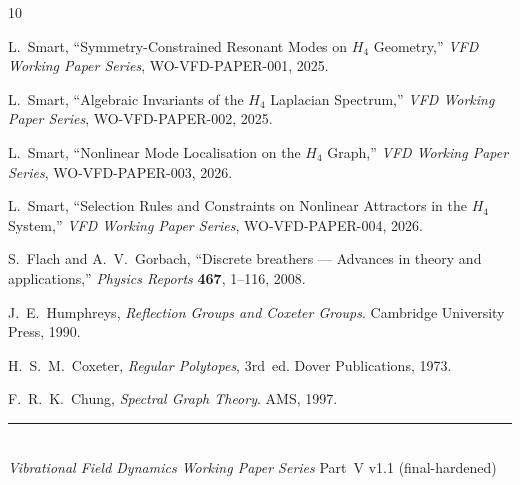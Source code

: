 \documentclass[12pt,a4paper]{article}
\begin{document}
\begin{thebibliography}{10}

L.~Smart,
``Symmetry-Constrained Resonant Modes on $H_4$ Geometry,''
\textit{VFD Working Paper Series}, WO-VFD-PAPER-001, 2025.

L.~Smart,
``Algebraic Invariants of the $H_4$ Laplacian Spectrum,''
\textit{VFD Working Paper Series}, WO-VFD-PAPER-002, 2025.

L.~Smart,
``Nonlinear Mode Localisation on the $H_4$ Graph,''
\textit{VFD Working Paper Series}, WO-VFD-PAPER-003, 2026.

L.~Smart,
``Selection Rules and Constraints on Nonlinear Attractors
in the $H_4$ System,''
\textit{VFD Working Paper Series}, WO-VFD-PAPER-004, 2026.

S.~Flach and A.~V.~Gorbach,
``Discrete breathers --- Advances in theory and applications,''
\textit{Physics Reports} \textbf{467}, 1--116, 2008.

J.~E.~Humphreys,
\textit{Reflection Groups and Coxeter Groups}.
Cambridge University Press, 1990.

H.~S.~M.~Coxeter,
\textit{Regular Polytopes}, 3rd~ed.
Dover Publications, 1973.

F.~R.~K.~Chung,
\textit{Spectral Graph Theory}.
AMS, 1997.

\end{thebibliography}

\vfill
\noindent\rule{\textwidth}{0.4pt}\\[4pt]
{\footnotesize
\textit{Vibrational Field Dynamics Working Paper Series}
\hfill Part~V \quad v1.1 (final-hardened)}
\end{document}
